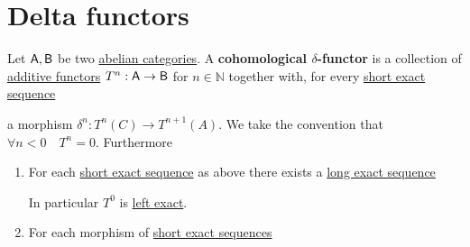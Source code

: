 \documentclass[../../../main]{subfiles}
\begin{document}
\section{Delta functors}

\begin{definition} \label{def:delta-functor}
  Let \(\mathsf{A}, \mathsf{B}\) be two \hyperref[def:abelian-category]{abelian categories}.
  A \textbf{cohomological \(\delta\)-functor} is a collection of \hyperref[def:additive-functor]{additive functors} \(T^{n}: \mathsf{A} \to \mathsf{B}\) for \(n \in \mathbb{N}\) together with, for every \hyperref[def:short-exact-sequence]{short exact sequence}
  \begin{center}
  \end{center}
  a morphism \(\delta^{n}: T^{n}(C) \to T^{n+1}(A)\). We take the convention that \(\forall n < 0 \quad T^{n} = 0\).
  Furthermore
  \begin{enumerate}
    \item For each \hyperref[def:short-exact-sequence]{short exact sequence} as above there exists a \hyperref[def:exact-complex-sequence]{long exact sequence}
          \begin{center}
          \end{center}
          In particular \(T^{0}\) is \hyperref[def:exact-complex-functor]{left exact}.
    \item For each morphism of \hyperref[def:short-exact-sequence]{short exact sequences}

\end{enumerate}
\end{definition}
\end{document}
